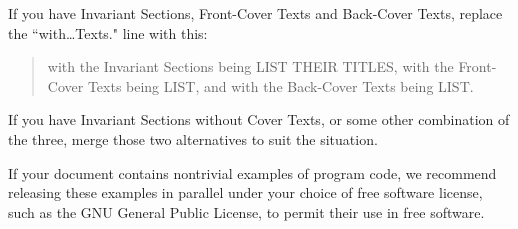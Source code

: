 \documentclass[12pt]{book}
\numberwithin{exc}{section}
\numberwithin{figure}{section}
\numberwithin{equation}{theorem}
\begin{document}
If you have Invariant Sections, Front-Cover Texts and Back-Cover Texts,
replace the ``with\ldots Texts." line with this:

\bigskip
\begin{quote}
    with the Invariant Sections being LIST THEIR TITLES, with the
    Front-Cover Texts being LIST, and with the Back-Cover Texts being LIST.
\end{quote}
\bigskip
    
If you have Invariant Sections without Cover Texts, or some other
combination of the three, merge those two alternatives to suit the
situation.

If your document contains nontrivial examples of program code, we
recommend releasing these examples in parallel under your choice of
free software license, such as the GNU General Public License,
to permit their use in free software.

\end{document}
